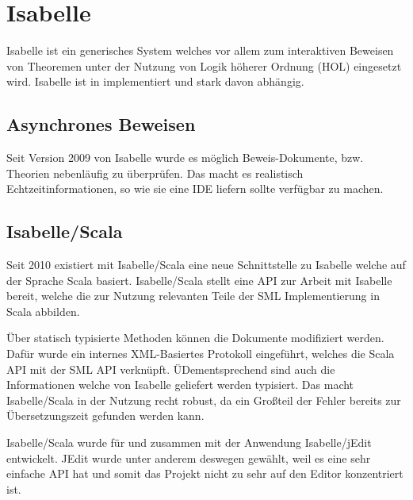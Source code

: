 \section{Isabelle}

Isabelle ist ein generisches System welches vor allem zum interaktiven Beweisen von Theoremen unter
der Nutzung von Logik höherer Ordnung (HOL) eingesetzt wird. Isabelle ist in  implementiert
und stark davon abhängig. \cite{isabelle}


\subsection{Asynchrones Beweisen}

Seit Version 2009 von Isabelle wurde es möglich Beweis-Dokumente, bzw. Theorien nebenläufig zu
überprüfen. Das macht es realistisch Echtzeitinformationen, so wie sie eine IDE liefern sollte
verfügbar zu machen.

\subsection{Isabelle/Scala}

Seit 2010 existiert mit Isabelle/Scala eine neue Schnittstelle zu Isabelle welche auf der Sprache
Scala basiert. Isabelle/Scala stellt eine API zur Arbeit mit Isabelle bereit, welche die zur Nutzung
relevanten Teile der SML Implementierung in Scala abbilden. \cite{iscala}

Über statisch typisierte Methoden können die Dokumente modifiziert werden. Dafür wurde ein internes
XML-Basiertes Protokoll eingeführt, welches die Scala API mit der SML API verknüpft.
ÜDementsprechend sind auch die Informationen welche von Isabelle geliefert werden typisiert. Das
macht Isabelle/Scala in der Nutzung recht robust, da ein Großteil der Fehler bereits zur
Übersetzungszeit gefunden werden kann.

Isabelle/Scala wurde für und zusammen mit der Anwendung Isabelle/jEdit entwickelt. JEdit wurde unter
anderem deswegen gewählt, weil es eine sehr einfache API hat und somit das Projekt nicht zu sehr auf
den Editor konzentriert ist.

